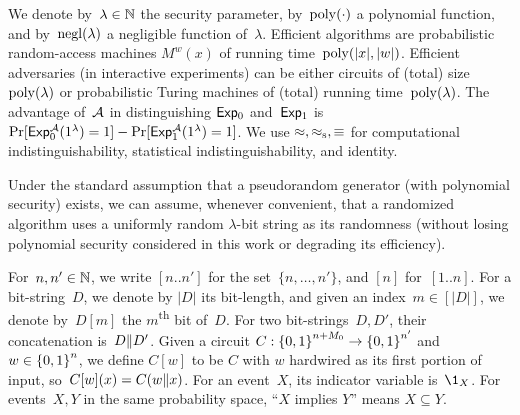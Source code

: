 We denote by~${\lambda\in{\mathbb{N}}}$ the security parameter,
by~$\operatorname{poly}({\cdot})$ a polynomial function, and
by~$\operatorname{negl}(\lambda)$ a negligible function of~$\lambda$.
Efficient algorithms are probabilistic random-access machines $M^w(x)$ of running time~$\operatorname{poly}(|x|,|w|)$.
Efficient adversaries (in interactive experiments) can be either circuits of (total) size~$\operatorname{poly}(\lambda)$ or probabilistic Turing machines of (total) running time~$\operatorname{poly}(\lambda)$.
The advantage of~${\mathcal{A}}$ in distinguishing ${\smash{\mathsf{Exp}}}_0$ and~${\smash{\mathsf{Exp}}}_1$ is
${\Pr[{\smash{\mathsf{Exp}}}_0^{\mathcal{A}}(1^\lambda)=1]-\Pr[{\smash{\mathsf{Exp}}}_1^{\mathcal{A}}(1^\lambda)=1]}$.
We use $\approx,\approx_{\textup{s}},\equiv$ for computational indistinguishability, statistical indistinguishability, and identity.

Under the standard assumption that a pseudorandom generator (with polynomial security) exists,
we can assume, whenever convenient, that a randomized algorithm uses a uniformly random $\lambda$-bit string as its randomness (without losing polynomial security considered in this work or degrading its efficiency).

For~${n,n'\in{\mathbb{N}}}$, we write $[n..n']$ for the set~$\{n,\dots,n'\}$,
and $[n]$ for~$[1..n]$.
For a bit-string~$D$, we denote by $|D|$ its bit-length,
and given an index~${m\in[|D|]}$, we denote by~$D[m]$ the $m$\textsuperscript{th} bit of~$D$.
For two bit-strings~$D,D'$, their concatenation is~${D{\parallel} D'}$.
Given a circuit ${C:{\{0,1\}}^{n+M_0}\to{\{0,1\}}^{n'}}$ and ${w\in{\{0,1\}}^n}$, we define $C[w]$ to be $C$ with $w$ hardwired as its first portion of input,
so~${C[w](x)=C(w{\parallel} x)}$.
For an event~$X$, its indicator variable is~$\1_X$.
For events~$X,Y$ in the same probability space, ``$X$ implies $Y$'' means ${X\subseteq Y}$.
